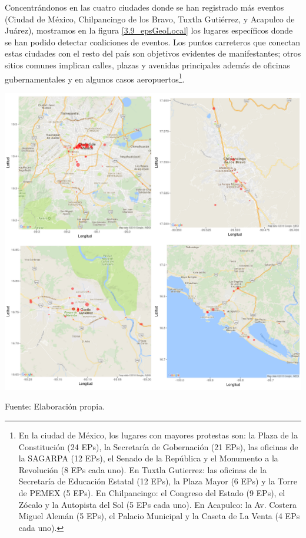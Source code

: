 \documentclass[letterpaper, 11pt]{book}
\theoremstyle{definition}
\theoremstyle{remark}
\begin{document}
Concentrándonos en las cuatro ciudades donde se han registrado más eventos (Ciudad de México, Chilpancingo de los Bravo, Tuxtla Gutiérrez, y Acapulco de Juárez), mostramos en la figura \ref{3.9_epsGeoLocal} los lugares específicos donde se han podido detectar coaliciones de eventos. 
Los puntos carreteros que conectan estas ciudades con el resto del país son objetivos evidentes de manifestantes; otros sitios comunes implican calles, plazas y avenidas principales además de oficinas gubernamentales y en algunos casos aeropuertos\footnote{
    En la ciudad de México, los lugares con mayores protestas son: la Plaza de la Constitución (24 EPs), la Secretaría de Gobernación (21 EPs), las oficinas de la SAGARPA (12 EPs), el Senado de la República y el Monumento a la Revolución (8 EPs cada uno). 
    En Tuxtla Gutierrez: las oficinas de la Secretaría de Educación Estatal (12 EPs), la Plaza Mayor (6 EPs) y la Torre de PEMEX (5 EPs). 
    En Chilpancingo: el Congreso del Estado (9 EPs), el Zócalo y la Autopista del Sol (5 EPs cada uno). 
    En Acapulco: la Av. Costera Miguel Alemán (5 EPs), el Palacio Municipal y la Caseta de La Venta (4 EPs cada uno).
}.


\hspace{-1em}\begin{minipage}{\linewidth}
\centering
{} \label{3.9_epsGeoLocal}
\hspace{-2em}\includegraphics[scale=0.5]{img/3.9_epsGeoLocal.png}
\par
\small Fuente: Elaboración propia.
\end{minipage}\bigskip
\end{document}
